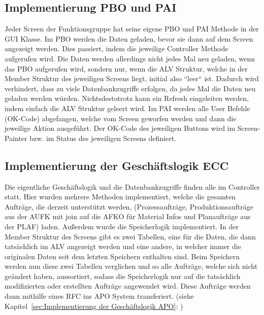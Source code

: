 \subsection{Implementierung PBO und PAI}
\label{sec:Implementierung PBO und PAI}
Jeder Screen der Funktionsgruppe hat seine eigene \ac{PBO} und \ac{PAI} Methode in der GUI Klasse. Im PBO werden die Daten geladen, bevor sie dann auf dem Screen angezeigt werden. Dies passiert, indem die jeweilige Controller Methode aufgerufen wird. Die Daten werden allerdings nicht jedes Mal neu geladen, wenn das \ac{PBO} aufgerufen wird, sondern nur, wenn die ALV Struktur, welche in der Member Struktur des jeweiligen Screens liegt, initial also ``leer`` ist. Dadurch wird verhindert, dass zu viele Datenbankzugriffe erfolgen, da jedes Mal die Daten neu geladen werden würden. Nichtsdestotrotz kann ein Refresh eingeleiten werden, indem einfach die \ac{ALV} Struktur geleert wird. Im \ac{PAI} werden alle User Befehle (OK-Code) abgefangen, welche vom Screen geworfen werden und dann die jeweilige Aktion ausgeführt. Der OK-Code des jeweiligen Buttons wird im Screen-Painter bzw. im Status des jeweiligen Screens definiert.

\subsection{Implementierung der Geschäftslogik ECC}
\label{sec:Implementierung der Geschäftslogik ECC}
Die eigentliche Geschäftslogik und die Datenbankzugriffe finden alle im Controller statt. Hier wurden mehrere Methoden implementiert, welche die gesamten Aufträge, die derzeit unterstützt werden, (Prozessaufträge, Produktionsaufträge aus der AUFK mit join auf die AFKO für Material Infos und Planaufträge aus der PLAF) laden. Außerdem wurde die Speicherlogik implementiert. In der Member Struktur des Screens gibt es zwei Tabellen, eine für die Daten, die dann tatsächlich im \ac{ALV} angezeigt werden und eine andere, in welcher immer die originalen Daten seit dem letzten Speichern enthalten sind. Beim Speichern werden nun diese zwei Tabellen verglichen und so alle Aufträge, welche sich nicht geändert haben, aussortiert, sodass die Speicherlogik nur auf die tatsächlich modifizierten oder erstellten Aufträge angewendet wird. Diese Aufträge werden dann mithilfe eines RFC ins \ac{APO} System transferiert. (siehe Kapitel~\ref{sec:Implementierung der Geschäftslogik APO}: )     

